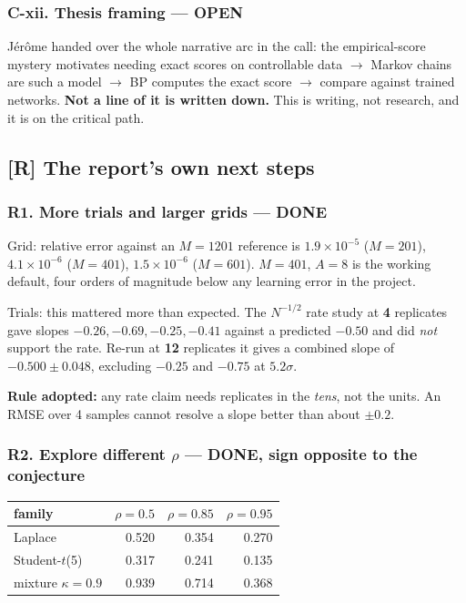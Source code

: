 \documentclass[11pt,a4paper]{article}
\newcommand{\done}{\textcolor{GoodGreen}{\textbf{DONE}}}
\newcommand{\open}{\textcolor{BadRed}{\textbf{OPEN}}}
\begin{document}
\subsubsection*{C-xii. Thesis framing --- \open}

J\'er\^ome handed over the whole narrative arc in the call: the empirical-score mystery
motivates needing exact scores on controllable data $\to$ Markov chains are such a model
$\to$ BP computes the exact score $\to$ compare against trained networks. \textbf{Not a line
of it is written down.} This is writing, not research, and it is on the critical path.

\subsection{[R] The report's own next steps}

\subsubsection*{R1. More trials and larger grids --- \done}

Grid: relative error against an $M=1201$ reference is $1.9\times10^{-5}$ ($M=201$),
$4.1\times10^{-6}$ ($M=401$), $1.5\times10^{-6}$ ($M=601$). $M=401$, $A=8$ is the working
default, four orders of magnitude below any learning error in the project.

Trials: this mattered more than expected. The $N^{-1/2}$ rate study at \textbf{4} replicates
gave slopes $-0.26, -0.69, -0.25, -0.41$ against a predicted $-0.50$ and did \emph{not}
support the rate. Re-run at \textbf{12} replicates it gives a combined slope of
$\mathbf{-0.500 \pm 0.048}$, excluding $-0.25$ and $-0.75$ at $5.2\sigma$.

\begin{keybox}
\textbf{Rule adopted:} any rate claim needs replicates in the \emph{tens}, not the units.
An RMSE over 4 samples cannot resolve a slope better than about $\pm 0.2$.
\end{keybox}

\subsubsection*{R2. Explore different $\rho$ --- \done, sign opposite to the conjecture}

\begin{center}
\begin{tabular}{@{}lrrr@{}}
\toprule
family & $\rho=0.5$ & $\rho=0.85$ & $\rho=0.95$ \\
\midrule
Laplace          & 0.520 & 0.354 & 0.270 \\
Student-$t$(5)   & 0.317 & 0.241 & 0.135 \\
mixture $\kappa=0.9$ & 0.939 & 0.714 & 0.368 \\
\bottomrule
\end{tabular}
\end{center}
\end{document}
